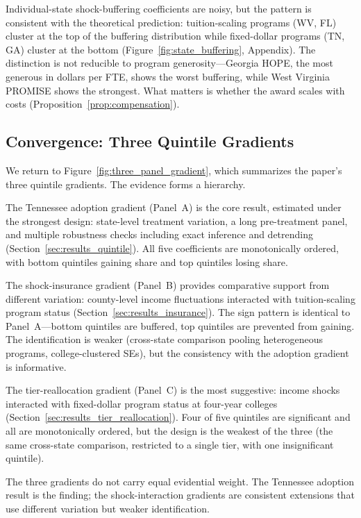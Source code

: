 Individual-state shock-buffering coefficients are noisy, but the
pattern is consistent with the theoretical prediction: tuition-scaling
programs (WV, FL) cluster at the top of the buffering distribution
while fixed-dollar programs (TN, GA) cluster at the bottom
(Figure~\ref{fig:state_buffering}, Appendix). The distinction is not
reducible to program generosity---Georgia HOPE, the most generous in
dollars per FTE, shows the worst buffering, while West Virginia
PROMISE shows the strongest. What matters is whether the award scales
with costs (Proposition~\ref{prop:compensation}).

\subsection{Convergence: Three Quintile Gradients}
\label{sec:results_convergence}

We return to Figure~\ref{fig:three_panel_gradient}, which summarizes
the paper's three quintile gradients. The evidence forms a hierarchy.

The Tennessee adoption gradient (Panel~A) is the core result,
estimated under the strongest design: state-level treatment variation,
a long pre-treatment panel, and multiple robustness checks including
exact inference and detrending
(Section~\ref{sec:results_quintile}). All five coefficients are
monotonically ordered, with bottom quintiles gaining share and top
quintiles losing share.

The shock-insurance gradient (Panel~B) provides comparative support
from different variation: county-level income fluctuations interacted
with tuition-scaling program status
(Section~\ref{sec:results_insurance}). The sign pattern is identical
to Panel~A---bottom quintiles are buffered, top quintiles are
prevented from gaining. The identification is weaker (cross-state
comparison pooling heterogeneous programs, college-clustered SEs),
but the consistency with the adoption gradient is informative.

The tier-reallocation gradient (Panel~C) is the most suggestive:
income shocks interacted with fixed-dollar program status at
four-year colleges (Section~\ref{sec:results_tier_reallocation}).
Four of five quintiles are significant and all are monotonically
ordered, but the design is the weakest of the three (the same
cross-state comparison, restricted to a single tier, with one
insignificant quintile).

The three gradients do not carry equal evidential weight. The
Tennessee adoption result is the finding; the shock-interaction
gradients are consistent extensions that use different variation
but weaker identification.

